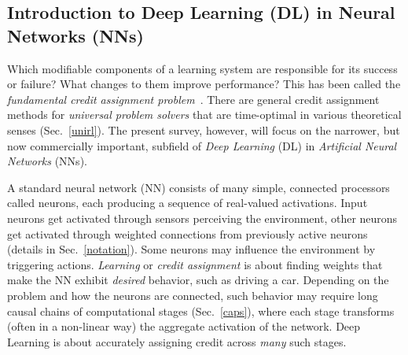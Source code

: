 \documentclass[letterpaper]{article}
\begin{document}
\begin{CJK*}{UTF8}{gbsn}


\section{Introduction to Deep Learning (DL) in Neural Networks (NNs)}
\label{intro}

Which modifiable components of a learning system are responsible for its success or failure?
What changes to them improve performance? 
This has been called the {\em fundamental credit assignment problem}~\citep{Minsky:63}.
There are general credit assignment methods for {\em universal problem solvers} 
that are 
time-optimal in various theoretical senses
(Sec.~\ref{unirl}).
The present survey, however, will focus on the narrower, but now commercially important, subfield
of {\em Deep Learning} (DL) in {\em Artificial Neural Networks} (NNs).


A standard neural network (NN) consists of many simple, connected
processors called neurons, each producing a sequence of real-valued
activations.  Input neurons get activated through sensors perceiving the
environment, other neurons get activated through weighted 
connections from previously active neurons (details in Sec.~\ref{notation}).  
Some neurons may influence the environment
by triggering actions.  {\em Learning} or {\em credit assignment} is
about finding weights that make the NN exhibit {\em desired} behavior,
such as driving a car.  Depending on the problem and how the neurons
are connected, such behavior may require long causal chains of
computational stages (Sec.~\ref{caps}), where each stage transforms
(often in a non-linear way) the aggregate activation of the
network. Deep Learning is about accurately assigning credit across
{\em many} such stages.




\end{CJK*}
\end{document}
